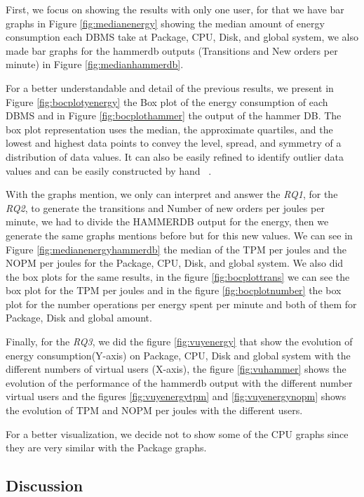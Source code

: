 First, we focus on showing the results with only one user, for that we have bar graphs in Figure \ref{fig:medianenergy} showing the median amount of energy consumption each DBMS take at Package, CPU, Disk, and global system, we also made bar graphs for the hammerdb outputs (Transitions and New orders per minute) in Figure  \ref{fig:medianhammerdb}.

For a better understandable and detail of the previous results, we present in Figure \ref{fig:bocplotyenergy} the Box plot of the energy consumption of each DBMS and in Figure \ref{fig:bocplothammer} the output of the hammer DB. The box plot representation uses the median, the approximate quartiles, and the lowest and highest data points to convey the level, spread, and symmetry of a distribution of data values. It can also be easily refined to identify outlier data values and can be easily constructed by hand ~\cite{doi:10.7326/0003-4819-110-11-916}.  %

With the graphs mention, we only can interpret and answer the \textit{RQ1}, for the \textit{RQ2}, to generate the transitions and Number of new orders per joules per minute, we had to divide the HAMMERDB  output for the energy, then we generate the same graphs mentions before but for this new values. We can see in Figure \ref{fig:medianenergyhammerdb} the median of the TPM per joules and the NOPM per joules for the Package, CPU, Disk, and global system. We also did the box plots for the same results, in the figure \ref{fig:bocplottrans} we can see the box plot for the  TPM per joules and in the figure \ref{fig:bocplotnumber} the box plot for the number operations per energy spent per minute and both of them for Package, Disk and global amount.

Finally, for the \textit{RQ3}, we did the figure \ref{fig:vuyenergy} that show the evolution of energy consumption(Y-axis) on Package, CPU, Disk and global system with the different numbers of virtual users (X-axis), the figure \ref{fig:vuhammer} shows the evolution of the performance of the hammerdb output with the different number virtual users and the figures \ref{fig:vuyenergytpm} and \ref{fig:vuyenergynopm}  shows the evolution of TPM and NOPM per joules with the different users.

For a better visualization, we decide not to show some of the CPU graphs since they are very similar with the Package graphs.

\subsection{Discussion}

